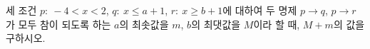 세 조건 $p:\ -4<x<2$, $q:\ x\le a+1$, $r:\ x\ge b+1$에 대하여 두 명제 $p\longrightarrow q$, $p\longrightarrow r$가 모두 참이 되도록 하는 $a$의 최솟값을 $m$, $b$의 최댓값을 $M$이라 할 때, $M+m$의 값을 구하시오. 
